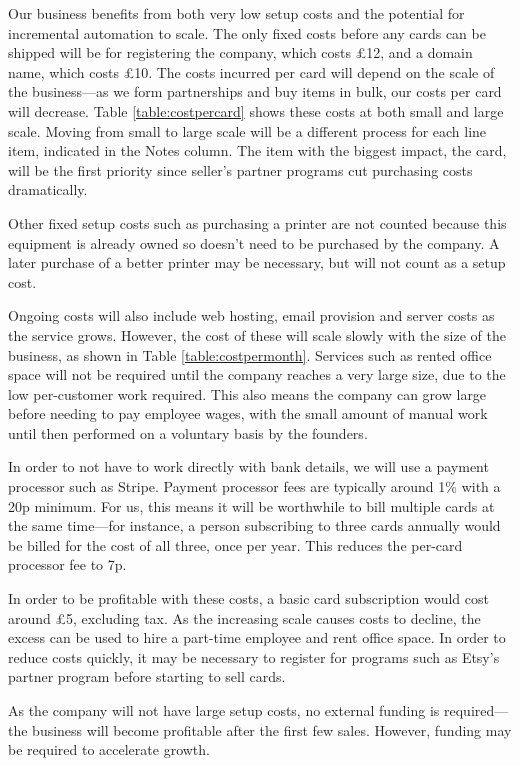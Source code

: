 Our business benefits from both very low setup costs and the potential for incremental automation to scale. The only fixed costs before any cards can be shipped will be for registering the company, which costs £12, and a domain name, which costs £10. The costs incurred per card will depend on the scale of the business---as we form partnerships and buy items in bulk, our costs per card will decrease. Table \ref{table:costpercard} shows these costs at both small and large scale. Moving from small to large scale will be a different process for each line item, indicated in the Notes column. The item with the biggest impact, the card, will be the first priority since seller's partner programs cut purchasing costs dramatically.

Other fixed setup costs such as purchasing a printer are not counted because this equipment is already owned so doesn't need to be purchased by the company. A later purchase of a better printer may be necessary, but will not count as a setup cost.

Ongoing costs will also include web hosting, email provision and server costs as the service grows. However, the cost of these will scale slowly with the size of the business, as shown in Table \ref{table:costpermonth}. Services such as rented office space will not be required until the company reaches a very large size, due to the low per-customer work required. This also means the company can grow large before needing to pay employee wages, with the small amount of manual work until then performed on a voluntary basis by the founders.

In order to not have to work directly with bank details, we will use a payment processor such as Stripe. Payment processor fees are typically around 1\% with a 20p minimum. For us, this means it will be worthwhile to bill multiple cards at the same time---for instance, a person subscribing to three cards annually would be billed for the cost of all three, once per year. This reduces the per-card processor fee to 7p.

In order to be profitable with these costs, a basic card subscription would cost around £5, excluding tax. As the increasing scale causes costs to decline, the excess can be used to hire a part-time employee and rent office space. In order to reduce costs quickly, it may be necessary to register for programs such as Etsy's partner program before starting to sell cards.

As the company will not have large setup costs, no external funding is required---the business will become profitable after the first few sales. However, funding may be required to accelerate growth.


